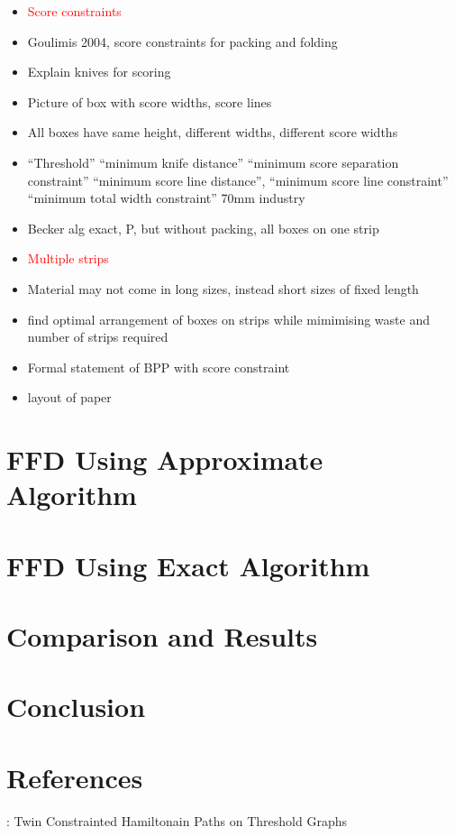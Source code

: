 \documentclass[oribibl]{llncs}
\begin{document}
\begin{itemize}
	\item \textcolor{red}{Score constraints}	
	\item Goulimis 2004, score constraints for packing and folding
	\item Explain knives for scoring
	\item Picture of box with score widths, score lines
	\item All boxes have same height, different widths, different score widths
	\item ``Threshold'' ``minimum knife distance'' ``minimum score separation constraint'' ``minimum score line distance'', ``minimum score line constraint'' ``minimum total width constraint'' 70mm industry
	\item Becker alg exact, P, but without packing, all boxes on one strip
	\item \textcolor{red}{Multiple strips}
	\item Material may not come in long sizes, instead short sizes of fixed length
	\item find optimal arrangement of boxes on strips while mimimising waste and number of strips required
	
	\item Formal statement of BPP with score constraint
	
	\item layout of paper
\end{itemize}

\section{FFD Using Approximate Algorithm}
\label{sec:ffdapprox}

\section{FFD Using Exact Algorithm}
\label{sec:ffdexact}

\section{Comparison and Results}
\label{sec:compresult}

\section{Conclusion}
\label{sec:conclusion}


\section{References}
\cite{becker2010}: Twin Constrainted Hamiltonain Paths on Threshold Graphs 
\end{document}
